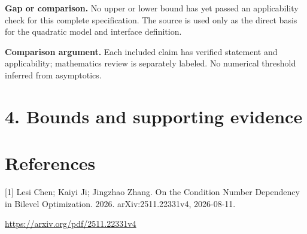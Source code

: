 \documentclass[10pt,a4paper]{article}
\begin{document}
\textbf{Gap or comparison.} No upper or lower bound has yet passed an applicability check for this complete specification. The source is used only as the direct basis for the quadratic model and interface definition.

\textbf{Comparison argument.} Each included claim has verified statement and applicability; mathematics review is separately labeled. No numerical threshold inferred from asymptotics.

\section{4. Bounds and supporting evidence}
\section{References}
[1] Lesi Chen; Kaiyi Ji; Jingzhao Zhang. On the Condition Number Dependency in Bilevel Optimization. 2026. arXiv:2511.22331v4, 2026-08-11.

\url{https://arxiv.org/pdf/2511.22331v4}
\end{document}
